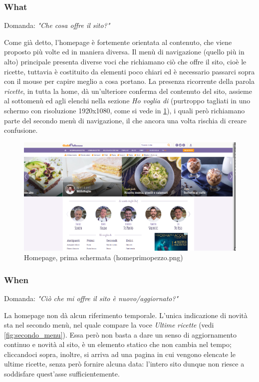 \newpage

\subsubsection{What} 

Domanda: \textit{"Che cosa offre il sito?"}

Come già detto, l'homepage è fortemente orientata al contenuto, che viene proposto più volte ed in maniera diversa. Il menù di navigazione (quello più in alto) principale presenta diverse voci che richiamano ciò che offre il sito, cioè le ricette, tuttavia è costituito da elementi poco chiari ed è necessario passarci sopra con il mouse per capire meglio a cosa portano. La presenza ricorrente della parola \textit{ricette}, in tutta la home, dà un'ulteriore conferma del contenuto del sito, assieme al sottomenù ed agli elenchi nella sezione \textit{Ho voglia di} (purtroppo tagliati in uno schermo con risoluzione 1920x1080, come si vede in \ref{fig:home_primo_pezzo}), i quali però richiamano parte del secondo menù di navigazione, il che ancora una volta rischia di creare confusione. 

\begin{figure}[h!]
	\centerline{
	\includegraphics[scale=0.25]{images/home_primo_pezzo.png}}
	\caption{Homepage, prima schermata (home\textunderscore primo\textunderscore pezzo.png)}
	\label{fig:home_primo_pezzo}
\end{figure}


\subsubsection{When} 
\label{subsez:when}

Domanda: \textit{"Ciò che mi offre il sito è nuovo/aggiornato?"}

La homepage non dà alcun riferimento temporale. L'unica indicazione di novità sta nel secondo menù, nel quale compare la voce \textit{Ultime ricette} (vedi \ref{fig:secondo_menu}). Essa però non basta a dare un senso di aggiornamento continuo e novità al sito, è un elemento statico che non cambia nel tempo; cliccandoci sopra, inoltre, si arriva ad una pagina in cui vengono elencate le ultime ricette, senza però fornire alcuna data: l'intero sito dunque non riesce a soddisfare quest'asse sufficientemente.

